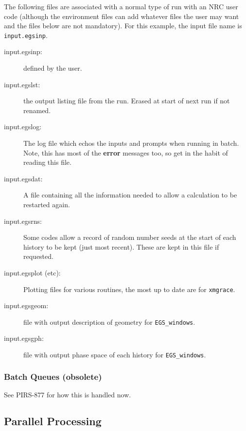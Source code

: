 The following files are associated with a normal type of run with an NRC
user code (although the environment files can add whatever files the user
may want and the files below are not mandatory).  For
this example, the input file name is \verb+input.egsinp+.
\begin{description}
\item [input.egsinp:] defined by the user.
\item [input.egslst:]  the output listing file from the run. Erased
at start of next run if not renamed.
\item [input.egslog:] The log file which echos the inputs and
prompts when running in batch. Note, this has most of the {\bf error}
messages too, so get in the habit of reading this file.
\item [input.egsdat:] A file containing all the information needed to
allow a calculation to be restarted again.
\item [input.egsrns:] Some codes allow a record of random number seeds
at the start of each history to be kept (just most recent). These are
kept in this file if requested.
\item [input.egsplot (etc):] Plotting files for various routines, the
most up to date are for \verb+xmgrace+.
\item [input.egsgeom:] file with output description of geometry for
\verb+EGS_windows+.
\item [input.egsgph:] file with output phase space of each history for
\verb+EGS_windows+.
\end{description}


\subsubsection{Batch Queues (obsolete)}
\label{batch_que}
See PIRS-877 for how this is handled now.


\subsection{Parallel Processing}
\label{pprocess}

